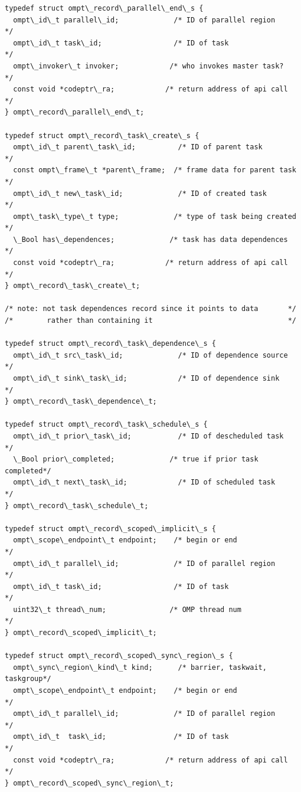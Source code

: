 \documentclass{article}
\begin{document}
\begin{boxedcode}
\begin{verbatim}
typedef struct ompt\_record\_parallel\_end\_s {
  ompt\_id\_t parallel\_id;             /* ID of parallel region       */
  ompt\_id\_t task\_id;                 /* ID of task                  */
  ompt\_invoker\_t invoker;            /* who invokes master task?    */
  const void *codeptr\_ra;            /* return address of api call  */ 
} ompt\_record\_parallel\_end\_t;

typedef struct ompt\_record\_task\_create\_s {
  ompt\_id\_t parent\_task\_id;          /* ID of parent task           */
  const ompt\_frame\_t *parent\_frame;  /* frame data for parent task  */
  ompt\_id\_t new\_task\_id;             /* ID of created task          */
  ompt\_task\_type\_t type;             /* type of task being created  */ 
  \_Bool has\_dependences;             /* task has data dependences   */
  const void *codeptr\_ra;            /* return address of api call  */ 
} ompt\_record\_task\_create\_t;

/* note: not task dependences record since it points to data       */
/*        rather than containing it                                */

typedef struct ompt\_record\_task\_dependence\_s {
  ompt\_id\_t src\_task\_id;             /* ID of dependence source     */
  ompt\_id\_t sink\_task\_id;            /* ID of dependence sink       */
} ompt\_record\_task\_dependence\_t;

typedef struct ompt\_record\_task\_schedule\_s {
  ompt\_id\_t prior\_task\_id;           /* ID of descheduled task      */
  \_Bool prior\_completed;             /* true if prior task completed*/
  ompt\_id\_t next\_task\_id;            /* ID of scheduled task        */
} ompt\_record\_task\_schedule\_t;

typedef struct ompt\_record\_scoped\_implicit\_s {
  ompt\_scope\_endpoint\_t endpoint;    /* begin or end                */
  ompt\_id\_t parallel\_id;             /* ID of parallel region       */
  ompt\_id\_t task\_id;                 /* ID of task                  */
  uint32\_t thread\_num;               /* OMP thread num              */
} ompt\_record\_scoped\_implicit\_t;

typedef struct ompt\_record\_scoped\_sync\_region\_s {
  ompt\_sync\_region\_kind\_t kind;      /* barrier, taskwait, taskgroup*/
  ompt\_scope\_endpoint\_t endpoint;    /* begin or end                */ 
  ompt\_id\_t parallel\_id;             /* ID of parallel region       */
  ompt\_id\_t  task\_id;                /* ID of task                  */
  const void *codeptr\_ra;            /* return address of api call  */
} ompt\_record\_scoped\_sync\_region\_t;


\end{verbatim}
\end{boxedcode}
\end{document}
